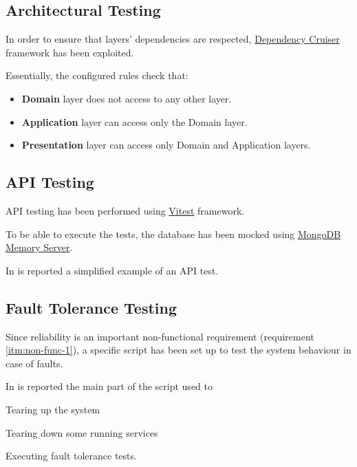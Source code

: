\documentclass{scrartcl}
\begin{document}
    \subsection{Architectural Testing}\label{subsec:architecture-testing}

    In order to ensure that layers' dependencies are respected, \href{https://github.com/sverweij/dependency-cruiser}{Dependency Cruiser} framework has been exploited.

    Essentially, the configured rules check that:

    \begin{itemize}
        \item \textbf{Domain} layer does not access to any other layer.
        \item \textbf{Application} layer can access only the Domain layer.
        \item \textbf{Presentation} layer can access only Domain and Application layers.
    \end{itemize}

    \subsection{API Testing}\label{subsec:api-testing}

    API testing has been performed using \href{https://vitest.dev/}{Vitest} framework.

    To be able to execute the tests, the database has been mocked using \href{https://github.com/nodkz/mongodb-memory-server}{MongoDB Memory Server}.

    In  is reported a simplified example of an API test.

    


    \subsection{Fault Tolerance Testing}\label{subsec:fault-tolerance-testing}

    Since reliability is an important non-functional requirement (requirement \ref{itm:non-func-1}),
    a specific script has been set up to test the system behaviour in case of faults.

    In  is reported the main part of the script used to
    \begin{enumerate*}
        \item Tearing up the system
        \item Tearing down some running services
        \item Executing fault tolerance tests.
    \end{enumerate*}
\end{document}
